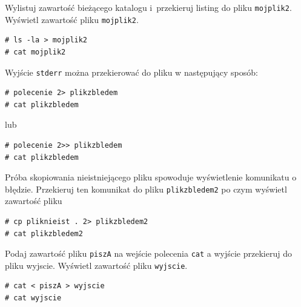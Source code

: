 \begin{example}

Wylistuj zawartość bieżącego katalogu i~przekieruj listing do pliku \lstinline[style=MyBashStyle]{mojplik2}. Wyświetl zawartość pliku \lstinline[style=MyBashStyle]{mojplik2}.


\begin{lstlisting}[style=MyBashStyle]
# ls -la > mojplik2
# cat mojplik2
\end{lstlisting}

Wyjście \lstinline[style=MyBashStyle]{stderr} można przekierować do pliku w następujący sposób:

\begin{lstlisting}[style=MyBashStyle]
# polecenie 2> plikzbledem
# cat plikzbledem
\end{lstlisting}

lub

\begin{lstlisting}[style=MyBashStyle]
# polecenie 2>> plikzbledem
# cat plikzbledem
\end{lstlisting}
\end{example}

\begin{example}

Próba skopiowania nieistniejącego pliku spowoduje wyświetlenie komunikatu o błędzie. Przekieruj ten komunikat do pliku \lstinline[style=MyBashStyle]{plikzbledem2} po czym wyświetl zawartość pliku

\begin{lstlisting}[style=MyBashStyle]
# cp pliknieist . 2> plikzbledem2
# cat plikzbledem2
\end{lstlisting}
\end{example}

\begin{example}
Podaj zawartość pliku \lstinline[style=MyBashStyle]{piszA} na wejście polecenia \lstinline[style=MyBashStyle]{cat} a wyjście przekieruj do pliku wyjscie. Wyświetl zawartość pliku \lstinline[style=MyBashStyle]{wyjscie}.

\begin{lstlisting}[style=MyBashStyle]
# cat < piszA > wyjscie
# cat wyjscie
\end{lstlisting}
\end{example}

